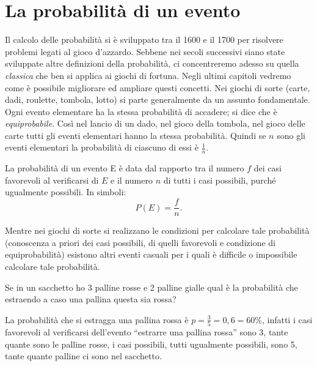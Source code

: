 \section{La probabilità di un evento}
\label{sec:02_definizioni}
Il calcolo delle probabilità si è sviluppato tra il 1600 e il 1700 per 
risolvere problemi legati al gioco d'azzardo. Sebbene nei secoli successivi 
siano state sviluppate altre definizioni della probabilità, ci concentreremo 
adesso su quella \emph{classica} che ben si applica ai giochi di fortuna. Negli 
ultimi capitoli vedremo come è possibile migliorare ed ampliare questi concetti.
Nei giochi di sorte (carte, dadi, roulette, tombola, lotto) si parte 
generalmente da un assunto fondamentale. Ogni evento elementare ha la stessa 
probabilità di accadere; si dice che è \emph{equiprobabile}.
Così nel lancio di un dado, nel gioco della tombola, nel 
gioco delle carte tutti gli eventi elementari hanno la stessa probabilità. 
Quindi se \(n\) sono gli eventi elementari la probabilità di ciascuno di essi è 
\(\frac 1 n\).

La probabilità di un evento E è data dal rapporto tra il numero \(f\) dei casi 
favorevoli al verificarsi di \(E\) e il numero \(n\) di tutti i casi possibili, 
purché ugualmente possibili. In simboli: \[ P(E)=\dfrac f n. \]

Mentre nei giochi di sorte si realizzano le condizioni per calcolare tale 
probabilità (conoscenza a priori dei casi possibili, di quelli favorevoli e 
condizione di equiprobabilità) esistono altri eventi casuali per i quali è 
difficile o impossibile calcolare tale probabilità.

\begin{esempio}
Se in un sacchetto ho 3 palline rosse e 2 palline gialle qual è la 
probabilità 
che estraendo a caso una pallina questa sia rossa?

La probabilità che si estragga una pallina rossa è \(p=\frac 3 
5=0,6=60\text{\%}\), infatti i casi favorevoli al verificarsi dell'evento 
``estrarre una pallina rossa'' sono 3, tante quante sono le palline rosse, i 
casi possibili, tutti ugualmente possibili, sono 5, tante quante palline ci 
sono 
nel sacchetto.
\end{esempio}

